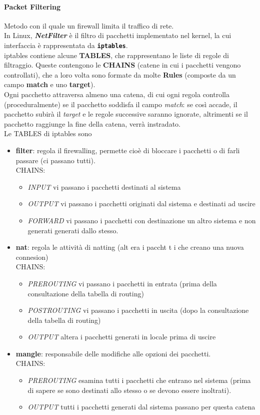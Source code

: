 \documentclass[a4paper,11pt]{article}
\def\code#1{\texttt{#1}}
\begin{document}
\paragraph{Packet Filtering} Metodo con il quale un firewall limita il traffico di rete. \\
In Linux, \textit{\textbf{NetFilter}} è il filtro di pacchetti  implementato nel kernel, la cui interfaccia è rappresentata da \textbf{\code{iptables}}.\\
iptables contiene alcune \textbf{TABLES}, che rappresentano le liste di regole di filtraggio. Queste contengono le \textbf{CHAINS} (catene in cui i pacchetti vengono controllati), che a loro volta sono formate da molte \textbf{Rules} (composte da un campo \textbf{match} e uno \textbf{target}).\\ Ogni pacchetto attraversa almeno una catena, di cui ogni regola controlla (proceduralmente) se il pacchetto soddisfa il campo \textit{match}: se così accade, il pacchetto subirà il \textit{target} e le regole successive saranno ignorate, altrimenti se il pacchetto raggiunge la fine della catena, verrà instradato.\\
Le TABLES di iptables sono
\begin{itemize}
\item \textbf{filter}: regola il firewalling, permette cioè di bloccare i pacchetti o di farli passare (ci passano tutti).\\ CHAINS:
\begin{itemize}
\item \textit{INPUT} vi passano i pacchetti destinati al sistema
\item \textit{OUTPUT} vi passano i pacchetti originati dal sistema e destinati ad uscire
\item \textit{FORWARD} vi passano i pacchetti con destinazione un altro sistema e non generati generati dallo stesso.
\end{itemize}
\item \textbf{nat}: regola le attività di natting (alt era i paccht t i che creano una nuova connesion) \\ CHAINS:
\begin{itemize}
\item \textit{PREROUTING} vi passano i pacchetti in entrata (prima della consultazione della tabella di routing)
\item \textit{POSTROUTING} vi passano i pacchetti in uscita (dopo la consultazione della tabella di routing)
\item \textit{OUTPUT} altera i pacchetti generati in locale prima di uscire
\end{itemize}
\item \textbf{mangle}: responsabile delle modifiche alle opzioni dei pacchetti. \\ CHAINS:
\begin{itemize}
\item \textit{PREROUTING} esamina tutti i pacchetti che entrano nel sistema (prima di sapere se sono destinati allo stesso o se devono essere inoltrati).
\item \textit{OUTPUT}  tutti i pacchetti generati dal sistema passano per questa catena
\end{itemize}
\end{itemize}
\end{document}
